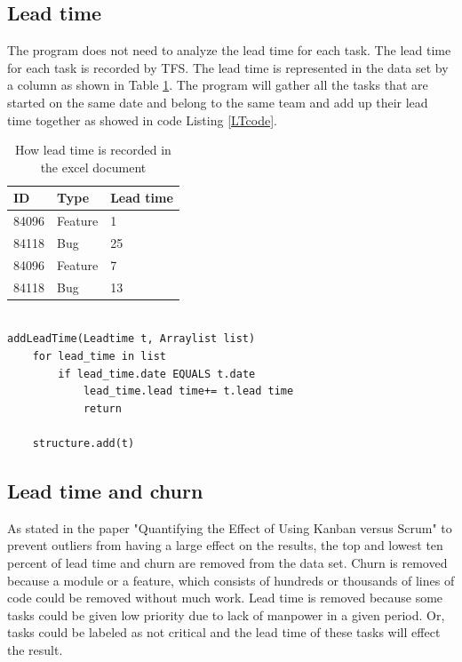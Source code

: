 \documentclass[UKenglish]{ifimaster}  %
\begin{document}
\subsection{Lead time}
\label{sec:LT}
The program does not need to analyze  the lead time for each task. The lead time for each task is recorded by TFS. The lead time is represented in the data set by a column as shown in Table \ref{table:LT}. The program will gather all the tasks that are started on the same date and belong to the same team and add up their lead time together as showed in code Listing \ref{LTcode}.   
\begin{table}[!ht]
\begin{center}
\begin{tabular}{ | l | l | l | }
\hline
	\bf{ID} & \bf{Type} & \bf{Lead time} \\ \hline
	84096 &  Feature  & 1 \\ \hline
	84118 &  Bug  & 25 \\ \hline
	84096 &  Feature  & 7 \\ \hline
	84118 &  Bug  & 13 \\ \hline
\end{tabular}
\caption{How lead time is recorded in the excel document}
\label{table:LT} %
\end{center}
\end{table}

\begin{minipage}{\textwidth}
\begin{lstlisting}[caption=Pseudocode example of lead time is measured, label=LTcode]

addLeadTime(Leadtime t, Arraylist list)
	for lead_time in list
		if lead_time.date EQUALS t.date
			lead_time.lead time+= t.lead time
			return
			
	structure.add(t)
\end{lstlisting}
\end{minipage}
\subsection{Lead time and churn}
As stated in the paper "Quantifying the Effect of Using Kanban versus Scrum" \parencite{Dag} to prevent outliers from having a large effect on the results, the top and lowest ten percent of lead time and churn are removed from the data set.
Churn is removed because a module or a feature, which consists of hundreds or thousands of lines of code could be removed without much work. Lead time is removed because some tasks could be given low priority due to lack of manpower in a given period. Or, tasks could be labeled as not critical and the lead time of these tasks will effect the result.
\end{document}
